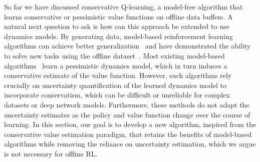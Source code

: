 \documentclass[../thesis.tex]{subfiles}
\begin{document}
So far we have discussed conservative Q-learning, a model-free algorithm that learns conservative or pessimistic value functions on offline data buffers. A natural next question to ask is how can this approach be extended to use dynamics models. By generating data, model-based reinforcement learning algorithms can achieve better generalization~\citep{sutton1991dyna,janner2019mbpo} and have demonstrated the ability to solve new tasks using the offline dataset~\cite{yu2020mopo}. Most existing model-based algorithms~\cite{kidambi2020morel, yu2020mopo} learn a pessimistic dynamics model, which in turn induces a conservative estimate of the value function. 
However, such algorithms rely crucially on uncertainty quantification of the learned dynamics model to incorporate conservatism, which can be difficult or unreliable for complex datasets or deep network models.
Furthermore, these methods do not adapt the uncertainty estimates as the policy and value function change over the course of learning.
In this section, our goal is to develop a new algorithm, inspired from the conservative value estimation paradigm, that retains the benefits of model-based algorithms while removing the reliance on uncertainty estimation, which we argue is not necessary for offline RL.
\end{document}
